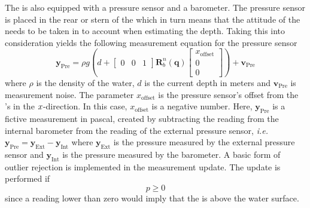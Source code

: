 The \abbrROV is also equipped with a pressure sensor and a barometer. The pressure sensor is placed in the rear or stern of the \abbrROV which in turn means that the attitude of the \abbrROV needs to be taken in to account when estimating the depth.
Taking this into consideration yields the following measurement equation for the pressure sensor
\begin{equation}
 \boldsymbol{y}_{\text{Pre}}=  \rho g \left(d + \begin{bmatrix}
    0 & 0 & 1
\end{bmatrix} \boldsymbol{R}^n_b(\boldsymbol{q}) 
\begin{bmatrix}
x_{\text{offset}}\\
0\\
0
\end{bmatrix}\right)
    + \boldsymbol{v}_{\text{Pre}}
\end{equation}
where $\rho$ is the density of the water, $d$ is the current depth in meters and $\boldsymbol{v}_{\text{Pre}}$ is measurement noise. The parameter $x_{\text{offset}}$ is the pressure sensor's offset from the \abbrROV's \abbrCO in the $x$-direction. In this case, $x_{\textrm{offset}}$ is a negative number. Here, $\boldsymbol{y}_{\text{Pre}}$ is a fictive measurement in pascal, created by subtracting the reading from the internal barometer from the reading of the external pressure sensor, \emph{i.e.} $\boldsymbol{y}_{\text{Pre}} =\boldsymbol{y}_{\text{Ext}} - \boldsymbol{y}_{\text{Int}}$ where $\boldsymbol{y}_{\text{Ext}}$ is the pressure measured by the external pressure sensor and $\boldsymbol{y}_{\text{Int}}$ is the pressure measured by the barometer. A basic form of outlier rejection is implemented in the measurement update. The update is performed if \begin{equation}
    p \geq 0
\end{equation}
since a reading lower than zero would imply that the \abbrROV is above the water surface.